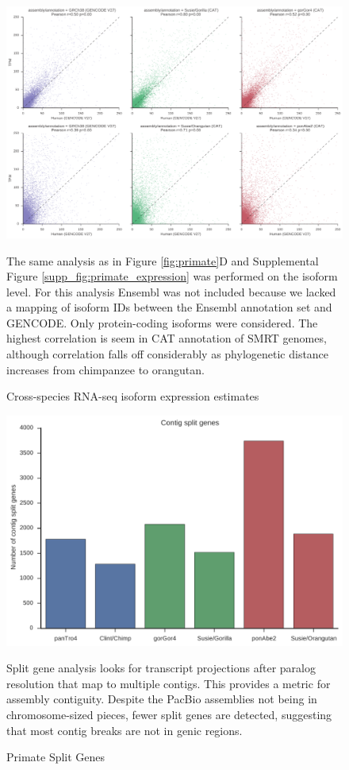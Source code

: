 \begin{figure}

\includegraphics[width=0.8\paperwidth,keepaspectratio]{Supplemental_Figure_S5.pdf}

\caption{Cross-species RNA-seq isoform expression estimates}
The same analysis as in Figure \ref{fig:primate}D and Supplemental Figure \ref{supp_fig:primate_expression} was performed on the isoform level. For this analysis Ensembl was not included because we lacked a mapping of isoform IDs between the Ensembl annotation set and GENCODE. Only protein-coding isoforms were considered. The highest correlation is seem in CAT annotation of SMRT genomes, although correlation falls off considerably as phylogenetic distance increases from chimpanzee to orangutan.

\label{supp_fig:primate_transcript_expression}
\end{figure}

\begin{figure}
\centering
\includegraphics[width=\textwidth,height=\textheight,keepaspectratio]{Supplemental_Figure_S6.pdf}
\caption{Primate Split Genes}
\label{supp_fig:primate_split_genes}
Split gene analysis looks for transcript projections after paralog resolution that map to multiple contigs. This provides a metric for assembly contiguity. Despite the PacBio assemblies not being in chromosome-sized pieces, fewer split genes are detected, suggesting that most contig breaks are not in genic regions.
\end{figure}

